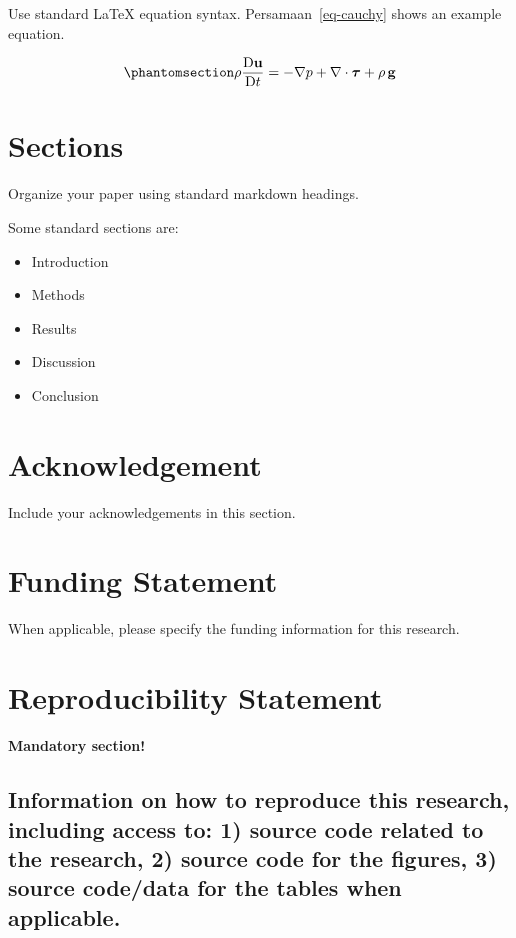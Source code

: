 \documentclass[
  manuscript=article,
  layout=publish,
  year=2026,
  volume=1,
]{den}
\providecommand{\tightlist}{%
  \setlength{\itemsep}{0pt}\setlength{\parskip}{0pt}}
\begin{document}
Use standard LaTeX equation syntax. Persamaan~\ref{eq-cauchy} shows an
example equation.

\begin{equation}\protect\phantomsection\label{eq-cauchy}{
\rho\frac{\mathrm{D} \mathbf{u}}{\mathrm{D} t} = - \nabla p + \nabla \cdot \boldsymbol \tau + \rho\,\mathbf{g}
}\end{equation}

\section{Sections}\label{sections}

Organize your paper using standard markdown headings.

Some standard sections are:

\begin{itemize}
\tightlist
\item
  Introduction
\item
  Methods
\item
  Results
\item
  Discussion
\item
  Conclusion
\end{itemize}

\section*{Acknowledgement}\label{acknowledgement}

Include your acknowledgements in this section.

\section*{Funding Statement}\label{funding-statement}

When applicable, please specify the funding information for this
research.

\section*{Reproducibility Statement}\label{reproducibility-statement}

\textbf{Mandatory section!}

\subsection{Information on how to reproduce this research, including
access to: 1) source code related to the research, 2) source code for
the figures, 3) source code/data for the tables when
applicable.}\label{information-on-how-to-reproduce-this-research-including-access-to-1-source-code-related-to-the-research-2-source-code-for-the-figures-3-source-codedata-for-the-tables-when-applicable.}
\end{document}
